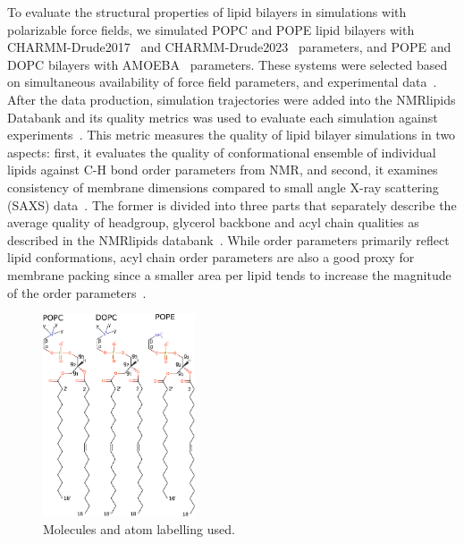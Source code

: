 \documentclass[journal=jacsat,manuscript=article,layout=singlecolumn]{achemso}
\begin{document}
To evaluate the structural properties of lipid bilayers in simulations with polarizable force fields, we simulated POPC and POPE lipid bilayers with CHARMM-Drude2017~\cite{li2017drude} and CHARMM-Drude2023~\cite{yu2023drude} parameters, and POPE and DOPC bilayers with AMOEBA~\cite{chu2018anionicpolarizable,chu2018polarizable} parameters. These systems were selected based on simultaneous availability of force field parameters, and experimental data~\cite{Databank}. After the data production, simulation trajectories were added into the NMRlipids Databank and its quality metrics was used to evaluate each simulation against experiments~\cite{Databank}. This metric measures the quality of lipid bilayer simulations in two aspects: first, it evaluates the quality of conformational ensemble of individual lipids against C-H bond order parameters from NMR, and second, it examines consistency of membrane dimensions compared to small angle X-ray scattering (SAXS) data~\cite{Databank,ollila16}. 
The former is divided into three parts that separately describe the average quality of headgroup, glycerol backbone and acyl chain qualities as described in the NMRlipids databank~\cite{Databank}. While order parameters primarily reflect lipid conformations, acyl chain order parameters are also a good proxy for membrane packing since a smaller area per lipid tends to increase the magnitude of the order parameters~\cite{Databank}. 

\begin{figure}[t]
    \centering
    \includegraphics[width=0.4\textwidth]{Figures/molecules.pdf}
    \caption{Molecules and atom labelling used.}
    \label{fig:molecules}

\end{figure}
\end{document}
